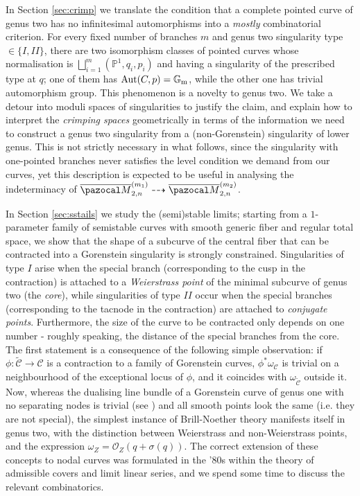 \documentclass[11pt]{amsart}
\newcommand{\PP}{\mathbb P}
\newcommand{\OO}{\mathcal O}
\renewcommand{\to}{\rightarrow}
\newcommand{\oM}{\overline{\pazocal M}}
\newcommand{\Gm}{\mathbb{G}_{\rm{m}}}
\newcommand{\Aut}{\operatorname{Aut}}
\theoremstyle{plain}
\theoremstyle{definition}
\begin{document}
In Section \ref{sec:crimp} we translate the condition that a complete pointed curve of genus two has no infinitesimal automorphisms into a \emph{mostly} combinatorial criterion. For every fixed number of branches $m$ and genus two singularity type $\in\{I,I\!I\}$, there are two isomorphism classes of pointed curves whose normalisation is $\bigsqcup_{i=1}^m(\PP^1,q_i,p_i)$ and having a singularity of the prescribed type at $q$; one of them has $\Aut(C,p)=\Gm$, while the other one has trivial automorphism group. This phenomenon is a novelty to genus two. We take a detour into moduli spaces of singularities to justify the claim, and explain how to interpret the \emph{crimping spaces} geometrically in terms of the information we need to construct a genus two singularity from a (non-Gorenstein) singularity of lower genus. This is not strictly necessary in what follows, since the singularity with one-pointed branches never satisfies the level condition we demand from our curves, yet this description is expected to be useful in analysing the indeterminacy of $\oM_{2,n}^{(m_1)}\dashrightarrow\oM_{2,n}^{(m_2)}$.

In Section \ref{sec:sstails} we study the (semi)stable limits; starting from a $1$-parameter family of semistable curves with smooth generic fiber and regular total space, we show that the shape of a subcurve of the central fiber that can be contracted into a Gorenstein singularity is strongly constrained. Singularities of type $I$ arise when the special branch (corresponding to the cusp in the contraction) is attached to a \emph{Weierstrass point} of the minimal subcurve of genus two (the \emph{core}), while singularities of type $I\!I$ occur when the special branches (corresponding to the tacnode in the contraction) are attached to \emph{conjugate points}. Furthermore, the size of the curve to be contracted only depends on one number - roughly speaking, the distance of the special branches from the core. The first statement is a consequence of the following simple observation: if $\phi\colon\widetilde{\mathcal C}\to\mathcal C$ is a contraction to a family of Gorenstein curves, $\phi^*\omega_{\mathcal C}$ is trivial on a neighbourhood of the exceptional locus of $\phi$, and it coincides with $\omega_{\widetilde{\mathcal C}}$ outside it. Now, whereas the dualising line bundle of a Gorenstein curve of genus one with no separating nodes is trivial (see \cite[Lemma 3.3]{SMY1}) and all smooth points look the same (i.e. they are not special), the simplest instance of Brill-Noether theory manifests itself in genus two, with the distinction between Weierstrass and non-Weierstrass points, and the expression $\omega_Z=\OO_Z(q+\sigma(q))$. The correct extension of these concepts to nodal curves was formulated in the '80s within the theory of admissible covers and limit linear series, and we spend some time to discuss the relevant combinatorics.
\end{document}
